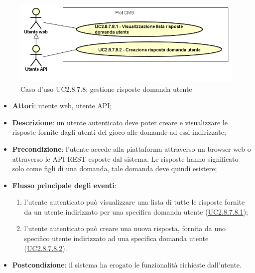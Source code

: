         \begin{figure}[H]
            \centering
            \includegraphics[scale=0.45, width=\textwidth]{immagini/usecase/UC2-8-7-8.png}
            \caption{Caso d'uso UC2.8.7.8: gestione risposte domanda utente}\label{fig:UC2.8.7.8} 
        \end{figure}
\begin{itemize}
\item \textbf{Attori}: utente web, utente API;
\item \textbf{Descrizione}: un utente autenticato deve poter creare e visualizzare le risposte fornite dagli utenti del gioco alle domande ad essi indirizzate; 
      \item \textbf{Precondizione}: l'utente accede alla piattaforma attraverso un browser web o attraverso le API REST esposte dal sistema. Le risposte hanno significato solo come figli di una domanda, tale domanda deve quindi esistere;

        \item \textbf{Flusso principale degli eventi}:
          \begin{enumerate}
          \item l'utente autenticato può visualizzare una lista di tutte le risposte fornite da un utente indirizzato per una specifica domanda utente (\hyperlink{UC2.8.7.8.1}{UC2.8.7.8.1});
          \item l'utente autenticato può creare una nuova risposta, fornita da uno specifico utente indirizzato ad una specifica domanda utente (\hyperlink{UC2.8.7.8.2}{UC2.8.7.8.2}).

      \end{enumerate}
    \item \textbf{Postcondizione}: il sistema ha erogato le funzionalità richieste dall'utente.
  \end{itemize}
\hypertarget{UC2.8.7.8.1}{}
